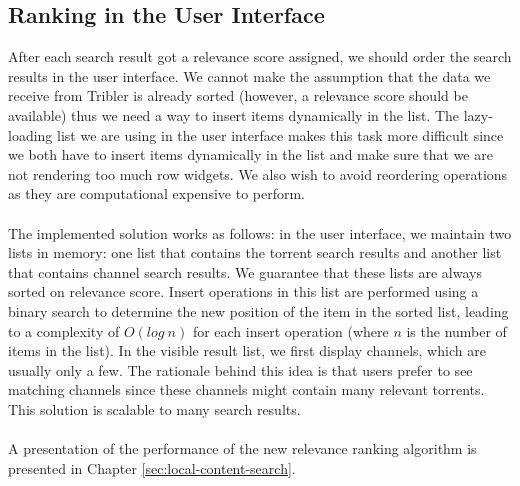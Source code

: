 \subsection{Ranking in the User Interface}
After each search result got a relevance score assigned, we should order the search results in the user interface. We cannot make the assumption that the data we receive from Tribler is already sorted (however, a relevance score should be available) thus we need a way to insert items dynamically in the list. The lazy-loading list we are using in the user interface makes this task more difficult since we both have to insert items dynamically in the list and make sure that we are not rendering too much row widgets. We also wish to avoid reordering operations as they are computational expensive to perform.\\\\
The implemented solution works as follows: in the user interface, we maintain two lists in memory: one list that contains the torrent search results and another list that contains channel search results. We guarantee that these lists are always sorted on relevance score. Insert operations in this list are performed using a binary search to determine the new position of the item in the sorted list, leading to a complexity of $ O(log\ n) $ for each insert operation (where $ n $ is the number of items in the list). In the visible result list, we first display channels, which are usually only a few. The rationale behind this idea is that users prefer to see matching channels since these channels might contain many relevant torrents. This solution is scalable to many search results.\\\\
A presentation of the performance of the new relevance ranking algorithm is presented in Chapter \ref{sec:local-content-search}.


